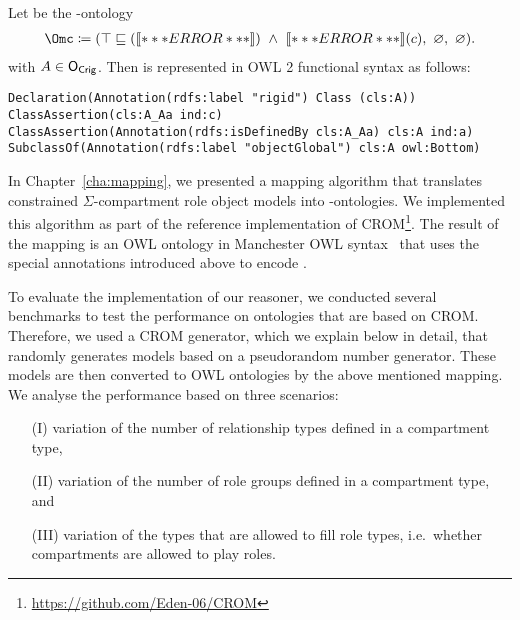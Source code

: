 \begin{example}\label{ex:outer-abstraction-as-OWL-w-global}
  Let \Omc be the \ALCALC-ontology
  \begin{align*}
    \Omc \coloneqq (\top\sqsubseteq(\oax{A\sqsubseteq\bot})\ \land\ \oax{A(a)}(c),\ \emptyset,\ \emptyset).
  \end{align*}
  with $A\in\mathsf{O_{Crig}}$. Then \Omc is represented in OWL 2 functional syntax as follows:

\smallskip\noindent
\verb+Declaration(Annotation(rdfs:label "rigid") Class (cls:A))+\\
\verb+ClassAssertion(cls:A_Aa ind:c)+\\
\verb+ClassAssertion(Annotation(rdfs:isDefinedBy cls:A_Aa) cls:A ind:a)+\\
\verb+SubclassOf(Annotation(rdfs:label "objectGlobal") cls:A owl:Bottom)+
\end{example}

In Chapter~\ref{cha:mapping}, we presented a mapping algorithm that translates constrained
$\Sigma$-compartment role object models into \LMLO-ontologies. We implemented this algorithm as part
of the reference implementation of CROM\footnote{\url{https://github.com/Eden-06/CROM}}. The result
of the mapping is an OWL ontology in Manchester OWL syntax~\cite{HoP-OWL2Man12} that uses the
special annotations introduced above to encode \LMLO.

To evaluate the implementation of our reasoner, we conducted several benchmarks to test the
performance on ontologies that are based on CROM. Therefore, we used a CROM generator, which we explain
below in detail, that randomly generates models based on a pseudorandom number generator. These models are
then converted to OWL ontologies by the above mentioned mapping. We analyse the performance based on
three scenarios:
\begin{enumerate}[leftmargin=30pt]
\item[(I)] variation of the number of relationship types defined in a compartment type,
\item[(II)] variation of the number of role groups defined in a compartment type, and
\item[(III)] variation of the types that are allowed to fill role types, i.e.\ whether compartments
  are allowed to play roles.
\end{enumerate}


